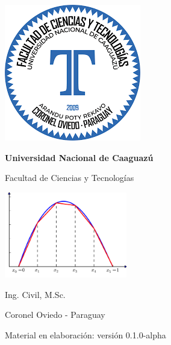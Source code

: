 
\begin{titlepage}
	\begin{center}
	
		\includegraphics[width=.2\textwidth]{figs/portada/LogoFCyT}
		
		\Large
		\textbf{Universidad Nacional de Caaguazú}
		
		\vspace{0.3cm}
		\Large
		Facultad de Ciencias y Tecnologías
		
		\vspace{1.2cm}
		
		\textbf{\Titulo}
		
		\subTitulo
		
		\vspace{1cm}
		
		\includegraphics[width=0.4\textwidth]{figs/portada/fem}
		
		\vspace{1cm}
		
		\textbf{\yo}
		
		Ing. Civil, M.Sc.
		
		\vspace{0.8cm}
		
		\large
		Coronel Oviedo - Paraguay
		
		\fecha
		\vspace{.5cm}
		
		Material en elaboración: versión 0.1.0-alpha
	\end{center}
\end{titlepage}

\restoregeometry